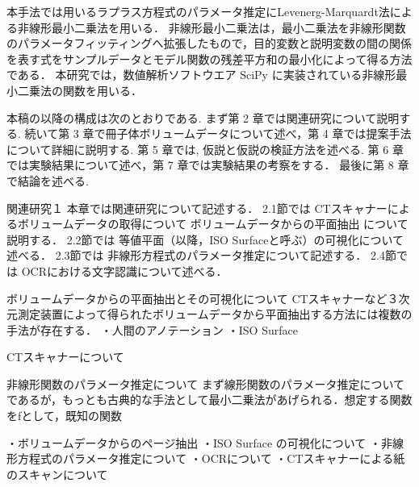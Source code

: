 


本手法では用いるラプラス方程式のパラメータ推定にLevenerg-Marquardt法による非線形最小二乗法を用いる．
非線形最小二乗法は，最小二乗法を非線形関数のパラメータフィッティングへ拡張したもので，目的変数と説明変数の間の関係を表す式をサンプルデータとモデル関数の残差平方和の最小化によって得る方法である．
本研究では，数値解析ソフトウエア SciPy に実装されている非線形最小二乗法の関数を用いる．


本稿の以降の構成は次のとおりである. まず第 2 章では関連研究について説明する.
続いて第 3 章で冊子体ボリュームデータについて述べ，第 4 章では提案手法について詳細に説明する.
第 5 章では, 仮説と仮説の検証方法を述べる.
第 6 章では実験結果について述べ，第 7 章では実験結果の考察をする．
最後に第 8 章で結論を述べる.



関連研究１
本章では関連研究について記述する．
2.1節では
CTスキャナーによるボリュームデータの取得について
ボリュームデータからの平面抽出
について説明する．
2.2節では
等値平面（以降，ISO Surfaceと呼ぶ）の可視化について述べる．
2.3節では
非線形方程式のパラメータ推定について記述する．
2.4節では
OCRにおける文字認識について述べる．

ボリュームデータからの平面抽出とその可視化について
CTスキャナーなど３次元測定装置によって得られたボリュームデータから平面抽出する方法には複数の手法が存在する．
・人間のアノテーション
・ISO Surface

CTスキャナーについて





非線形関数のパラメータ推定について
まず線形関数のパラメータ推定についてであるが，もっとも古典的な手法として最小二乗法があげられる．想定する関数をfとして，既知の関数


・ボリュームデータからのページ抽出
・ISO Surface の可視化について
・非線形方程式のパラメータ推定について
・OCRについて
・CTスキャナーによる紙のスキャンについて



